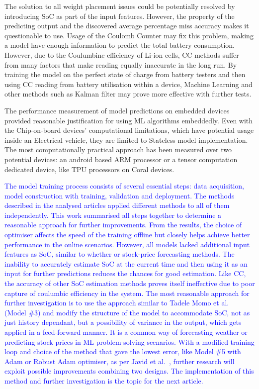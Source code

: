 %
%
The solution to all weight placement issues could be potentially resolved by introducing SoC as part of the input features.
However, the property of the predicting output and the discovered average percentage miss accuracy makes it questionable to use.
Usage of the Coulomb Counter may fix this problem, making a model have enough information to predict the total battery consumption.
However, due to the Coulumbinc efficiency of Li-ion cells, CC methods suffer from many factors that make reading equally inaccurate in the long run.
By training the model on the perfect state of charge from battery testers and then using CC reading from battery utilisation within a device, Machine Learning and other methods such as Kalman filter may prove more effective with further tests.

%
%
 {
The performance measurement of model predictions on embedded devices provided reasonable justification for using ML algorithms embeddedly.
Even with the Chip-on-board devices' computational limitations, which have potential usage inside an Electrical vehicle, they are limited to Stateless model implementation.
The most computationally practical approach has been measured over two potential devices: an android based ARM processor or a tensor computation dedicated device, like TPU processors on Coral devices.
} { }

%
\textcolor{blue}{The model training process consists of several essential steps: data acquisition, model construction with training, validation and deployment.
The methods described in the analysed articles applied different methods to all of them independently.
This work summarised all steps together to determine a reasonable approach for further improvements.
From the results, the choice of optimiser affects the speed of the training offline but closely helps achieve better performance in the online scenarios.
However, all models lacked additional input features as SoC, similar to whether or stock-price forecasting methods.
The inability to accurately estimate SoC at the current time and then using it as an input for further predictions reduces the chances for good estimation.
Like CC, the accuracy of other SoC estimation methods proves itself ineffective due to poor capture of coulumbic efficiency in the system.
The most reasonable approach for further investigation is to use the approach similar to Tadele Momo et al.~\cite{mamo_long_2020} (Model \#3) and modify the structure of the model to accommodate SoC, not as just history dependant, but a possibility of variance in the output, which gets applied in a feed-forward manner. 
It is a common way of forecasting weather or predicting stock prices in ML problem-solving scenarios.
With a modified training loop and choice of the method that gave the lowest error, like Model \#5 with Adam or Robust Adam optimiser, as per Javid et al.~\cite{javid_adaptive_2020}, further research will exploit possible improvements combining two designs.
The implementation of this method and further investigation is the topic for the next article.
}